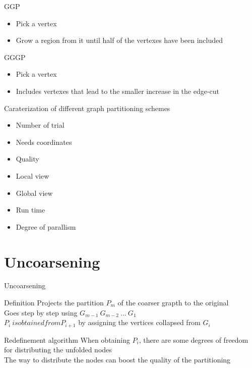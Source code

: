 \documentclass{beamer}
\begin{document}
\begin{frame}{GGP}
\begin{itemize}
\item Pick a vertex
\item Grow a region from it until half of the vertexes have been included
\end{itemize}
\end{frame}
\begin{frame}{GGGP}
\begin{itemize}
\item Pick a vertex
\item Includes vertexes that lead
to the smaller increase in the edge-cut
\end{itemize}
\end{frame}


\begin{frame}{Caraterization of different graph partitioning schemes}
\begin{itemize}
\item Number of trial
\item Needs coordinates
\item Quality
\item Local view
\item Global view
\item Run time
\item Degree of parallism
\end{itemize}
\end{frame}
\author[G.~Perez Bada]{Q.~Diaferia \and T.~Levasseur \and W.~Pei \and G.~Perez Bada}
\section{Uncoarsening}
\begin{frame}{Uncoarsening}
	\begin{block}{Definition}
		Projects the partition \(P_{m}\) of the coarser grapth to the original \\
		Goes step by step using \(G_{m-1}~G_{m-2}~...~G_1\) \\
		\(P_i~is obtained from P_{i+1}\) by assigning the vertices collapsed from \(G_i\)\\
	\end{block}
	\begin{block}{Redefinement algorithm}
		When obtaining \(P_i\), there are some degrees of freedom for distributing the unfolded nodes\\
		The way to distribute the nodes can boost the quality of the partitioning
	\end{block}
\end{frame}
\end{document}
